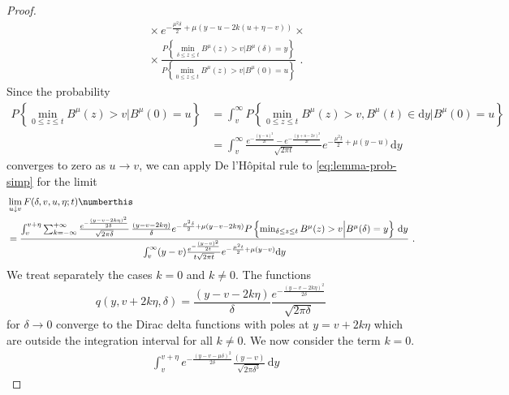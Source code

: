 \begin{proof}
\begin{align*}
	&\qquad \times 
	e^{ - \frac{\mu^2 \delta}{2}  + \mu ( y - u  - 2k(u + \eta - v)) }
	\times \\
	& \qquad \times 
	\frac{
		P\left\{ \min_{ \delta \leq z \leq t} B^\mu( z) > v \Big | B^\mu(\delta ) = y \right\}
	}{
		P\left\{ \min_{ 0 \leq z \leq t} B^\mu( z) > v \Big | B^\mu(0 ) = u \right\} 
	} \,\, .
	\end{align*}
	Since the probability
	\begin{align*}
	P\left\{ \min_{ 0 \leq z \leq t} B^\mu( z) > v \Big | B^\mu(0 ) = u \right\} &=
	\int_v^\infty 
	P\left\{ 
	\min_{ 0 \leq z \leq t} B^\mu( z) > v, B^\mu(t) \in \mathrm d y \Big | B^\mu(0) = u
	\right\} \\
	&=
	\int_{v}^{\infty} 
	\frac{
		e^{ - \frac{ (y - u )^2}  { 2t}}  - e^{ - \frac{(y+u - 2v)^2}{2t} }  
	}{\sqrt{2 \pi t}}
	e^{ - \frac{\mu^2t} {2  } + \mu ( y - u) }  \mathrm d y 
	\end{align*}
	converges to zero as $  u \to v $, we can apply De l'H\^opital rule to \eqref{eq:lemma-prob-simp} for the limit 
	\begin{align*}
	& \lim\limits_{u \downarrow v} F( \delta, v, u, \eta ; t)  
	\numberthis 
	\label{eq:lemma-prob-hop}
	\\
	&=
	\frac{ 
		\int_{v}^{v+\eta} 
		\sum_{k= - \infty}^{+ \infty} 
		\frac{
			e^{  - \frac{  ( y - v - 2k\eta  )^2}{2 \delta}  }
		}{\sqrt{2 \pi \delta }}   \, \frac{(y - v - 2 k \eta )}{\delta} 
		e^{   
			- \frac{\mu^2 \delta }{2} + \mu ( y - v - 2 k \eta) 
		}
		P\left\{ \min_{ \delta \leq z \leq t} B^\mu( z) > v \Big | B^\mu(\delta ) = y \right\}
		\, \mathrm d y 
	}
	{
		\int_v^\infty  (y-v) \frac {e^{ -   \frac{  ( y - v)^2}{2t} }}{t \sqrt { 2 \pi t} }
		e^{   
			- \frac{\mu^2 t}{2} + \mu ( y - v ) 
		}
		\mathrm d y 
	} \,\,.
	\end{align*}
	We treat separately the cases $ k=0 $ and $  k \neq 0 $. 
	The functions 
	\begin{equation}
	q(y, v + 2 k \eta, \delta) = \frac{(y - v-2 k \eta)}{\delta} 
	\frac{e^{ -  \frac{ (y-v - 2 k \eta)^2}{2 \delta }  }}{\sqrt{2 \pi \delta}}
	\end{equation}
	for $  \delta \to 0 $ converge to the Dirac delta functions with poles at $  y  = v  + 2 k \eta $
	which are outside the integration interval for all $  k \neq 0 $. 
	We now consider the term $ k = 0 $. 
	\begin{align*}
	&
	\int_{v }^{v + \eta } e^{ - \frac{(y - v - \mu \delta)^2}{2 \delta}}
	\frac{(y-v)}{\sqrt{2 \pi \delta^3}} \, \mathrm d y 

\end{align*}
\end{proof}
